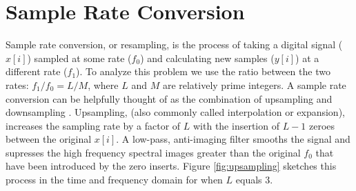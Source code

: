 \section{Sample Rate Conversion} \label{sec:src_basics}

Sample rate conversion, or resampling, is the process of taking a digital signal ($x[i]$) sampled at some rate 
($f_0$) and calculating new samples ($y[i]$) at a different rate ($f_1$).  To analyze this problem we use the 
ratio between the two rates: $f_1/f_0 = L/M$, where $L$ and $M$ are relatively prime integers.  A sample rate 
conversion can be helpfully thought of as the combination of upsampling and downsampling 
\citep{oppenheim10,lyons11}.  
Upsampling, (also commonly called interpolation or expansion), increases the sampling rate 
by a factor of $L$ with the insertion of $L-1$ zeroes between the original $x[i]$.  A low-pass, 
anti-imaging filter smooths the signal and supresses the high frequency spectral images greater than the original 
$f_0$ that have been introduced by the zero inserts.  Figure \ref{fig:upsampling} sketches this process in the 
time and frequency domain for when $L$ equals 3. 

